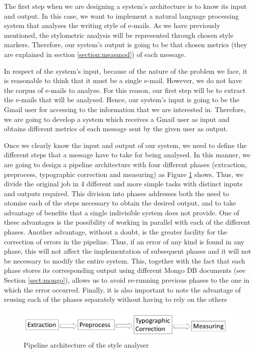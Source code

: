 The first step when we are designing a system's architecture is to know its input and output. In this case, we want to implement a natural language processing system that analyses the writing style of e-mails. As we have previously mentioned, the stylometric analysis will be represented through chosen style markers. Therefore, our system's output is going to be that chosen metrics (they are explained in section \ref{section:measmod}) of each message.

In respect of the system's input, because of the nature of the problem we face, it is reasonable to think that it must be a single e-mail. However, we do not have the corpus of e-mails to analyse. For this reason, our first step will be to extract the e-mails that will be analysed. Hence, our system's input is going to be the Gmail user for accessing to the information that we are interested in. Therefore, we are going to develop a system which receives a Gmail user as input and obtains different metrics of each message sent by the given user as output.

Once we clearly know the input and output of our system, we need to define the different steps that a message have to take for being analysed. In this manner, we are going to design a pipeline architecture with four different phases (extraction, preprocess, typographic correction and measuring) as Figure \ref{fig:arch} shows. Thus, we divide the original job in 4 different and more simple tasks with distinct inputs and outputs required. This division into phases addresses both the need to atomise each of the steps necessary to obtain the desired output, and to take advantage of benefits that a single indivisible system does not provide. One of these advantages is the possibility of working in parallel with each of the different phases. Another advantage, without a doubt, is the greater facility for the correction of errors in the pipeline. Thus, if an error of any kind is found in any phase, this will not affect the implementation of subsequent phases and it will not be necessary to modify the entire system. This, together with the fact that each phase stores its corresponding output using different Mongo DB documents (see Section \ref{sect:mongo}), allows us to avoid re-running previous phases to the one in which the error occurred. Finally, it is also important to note the advantage of reusing each of the phases separately without having to rely on the others

\begin{figure}[h]
	\centering%
	\includegraphics[width = 1\textwidth]{Imagenes/Bitmap/architecture.png}%
	\caption{Pipeline architecture of the style analyser}%
	\label{fig:arch}
\end{figure}

